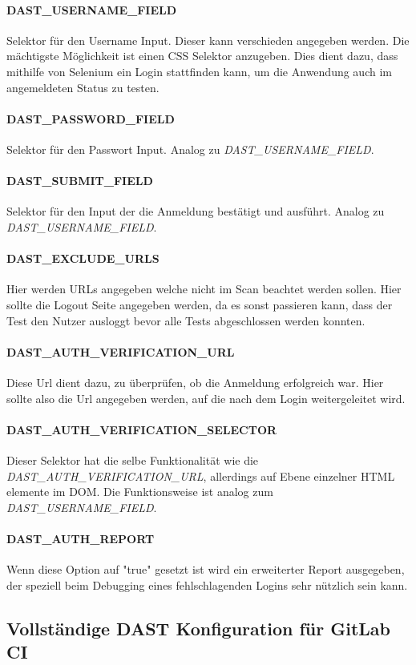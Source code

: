 \paragraph{DAST\_USERNAME\_FIELD}
Selektor für den Username Input.
Dieser kann verschieden angegeben werden.
Die mächtigste Möglichkeit ist einen CSS Selektor anzugeben.
Dies dient dazu, dass mithilfe von Selenium ein Login stattfinden kann, um die Anwendung auch im angemeldeten Status zu testen.
\paragraph{DAST\_PASSWORD\_FIELD}
Selektor für den Passwort Input.
Analog zu \textit{DAST\_USERNAME\_FIELD}.
\paragraph{DAST\_SUBMIT\_FIELD}
Selektor für den Input der die Anmeldung bestätigt und ausführt.
Analog zu \textit{DAST\_USERNAME\_FIELD}.
\paragraph{DAST\_EXCLUDE\_URLS}
Hier werden URLs angegeben welche nicht im Scan beachtet werden sollen.
Hier sollte die Logout Seite angegeben werden, da es sonst passieren kann, dass der Test den Nutzer ausloggt bevor alle Tests abgeschlossen werden konnten.
\paragraph{DAST\_AUTH\_VERIFICATION\_URL}
Diese Url dient dazu, zu überprüfen, ob die Anmeldung erfolgreich war.
Hier sollte also die Url angegeben werden, auf die nach dem Login weitergeleitet wird.
\paragraph{DAST\_AUTH\_VERIFICATION\_SELECTOR}
Dieser Selektor hat die selbe Funktionalität wie die \textit{DAST\_AUTH\_VERIFICATION\_URL}, allerdings auf Ebene einzelner HTML elemente im DOM.
Die Funktionsweise ist analog zum \textit{DAST\_USERNAME\_FIELD}.
\paragraph{DAST\_AUTH\_REPORT}
Wenn diese Option auf "true" gesetzt ist wird ein erweiterter Report ausgegeben, der speziell beim Debugging eines fehlschlagenden Logins sehr nützlich sein kann.
\newpage
\subsection{Vollständige DAST Konfiguration für GitLab CI}

